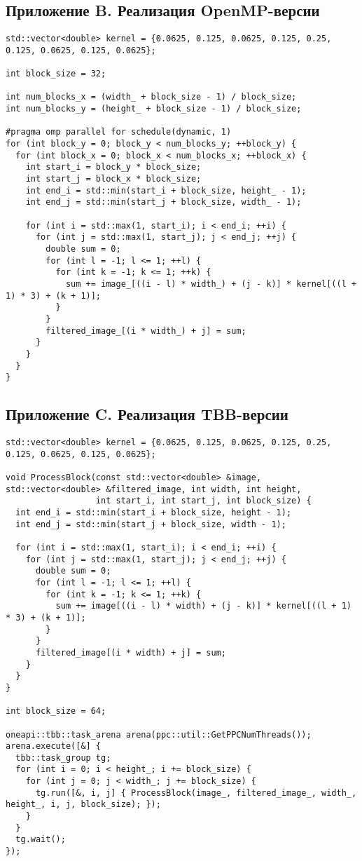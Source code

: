 \documentclass[14pt, a4paper]{extarticle}
\begin{document}
\newpage

\subsection*{Приложение B. Реализация OpenMP-версии}
\begin{lstlisting}
std::vector<double> kernel = {0.0625, 0.125, 0.0625, 0.125, 0.25, 0.125, 0.0625, 0.125, 0.0625};

int block_size = 32;

int num_blocks_x = (width_ + block_size - 1) / block_size;
int num_blocks_y = (height_ + block_size - 1) / block_size;

#pragma omp parallel for schedule(dynamic, 1)
for (int block_y = 0; block_y < num_blocks_y; ++block_y) {
  for (int block_x = 0; block_x < num_blocks_x; ++block_x) {
    int start_i = block_y * block_size;
    int start_j = block_x * block_size;
    int end_i = std::min(start_i + block_size, height_ - 1);
    int end_j = std::min(start_j + block_size, width_ - 1);

    for (int i = std::max(1, start_i); i < end_i; ++i) {
      for (int j = std::max(1, start_j); j < end_j; ++j) {
        double sum = 0;
        for (int l = -1; l <= 1; ++l) {
          for (int k = -1; k <= 1; ++k) {
            sum += image_[((i - l) * width_) + (j - k)] * kernel[((l + 1) * 3) + (k + 1)];
          }
        }
        filtered_image_[(i * width_) + j] = sum;
      }
    }
  }
}
\end{lstlisting}

\newpage

\subsection*{Приложение C. Реализация TBB-версии}
\begin{lstlisting}
std::vector<double> kernel = {0.0625, 0.125, 0.0625, 0.125, 0.25, 0.125, 0.0625, 0.125, 0.0625};

void ProcessBlock(const std::vector<double> &image, std::vector<double> &filtered_image, int width, int height,
                  int start_i, int start_j, int block_size) {
  int end_i = std::min(start_i + block_size, height - 1);
  int end_j = std::min(start_j + block_size, width - 1);

  for (int i = std::max(1, start_i); i < end_i; ++i) {
    for (int j = std::max(1, start_j); j < end_j; ++j) {
      double sum = 0;
      for (int l = -1; l <= 1; ++l) {
        for (int k = -1; k <= 1; ++k) {
          sum += image[((i - l) * width) + (j - k)] * kernel[((l + 1) * 3) + (k + 1)];
        }
      }
      filtered_image[(i * width) + j] = sum;
    }
  }
}

int block_size = 64;

oneapi::tbb::task_arena arena(ppc::util::GetPPCNumThreads());
arena.execute([&] {
  tbb::task_group tg;
  for (int i = 0; i < height_; i += block_size) {
    for (int j = 0; j < width_; j += block_size) {
      tg.run([&, i, j] { ProcessBlock(image_, filtered_image_, width_, height_, i, j, block_size); });
    }
  }
  tg.wait();
});
\end{lstlisting}
\end{document}

